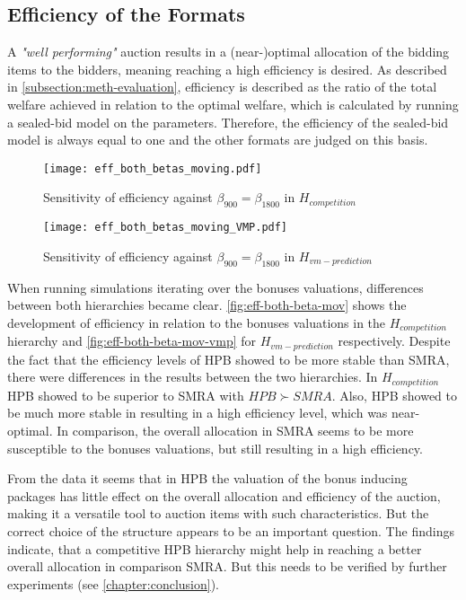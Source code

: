 \subsection{Efficiency of the Formats}\label{subsection:eff-formats}
A \textit{"well performing"} auction results in a (near-)optimal allocation of the bidding items to the bidders, meaning reaching a high efficiency is desired. As described in \autoref{subsection:meth-evaluation}, efficiency is described as the ratio of the total welfare achieved in relation to the optimal welfare, which is calculated by running a sealed-bid model on the parameters. Therefore, the efficiency of the sealed-bid model is always equal to one and the other formats are judged on this basis.

\begin{figure}[h]
	\centering
	\texttt{[image: eff\_both\_betas\_moving.pdf]}
	\caption{Sensitivity of efficiency against $ \beta_{900} = \beta_{1800} $ in $ H_{competition} $} \label{fig:eff-both-beta-mov}
	
	\vspace*{\floatsep}
	
	\texttt{[image: eff\_both\_betas\_moving\_VMP.pdf]}
	\caption{Sensitivity of efficiency against $ \beta_{900} = \beta_{1800} $ in $ H_{vm-prediction} $} \label{fig:eff-both-beta-mov-vmp}
\end{figure}

When running simulations iterating over the bonuses valuations, differences between both hierarchies became clear. \autoref{fig:eff-both-beta-mov} shows the development of efficiency in relation to the bonuses valuations in the $ H_{competition} $ hierarchy and \autoref{fig:eff-both-beta-mov-vmp} for $ H_{vm-prediction} $ respectively. Despite the fact that the efficiency levels of HPB showed to be more stable than SMRA, there were differences in the results between the two hierarchies. 
In $ H_{competition} $ HPB showed to be superior to SMRA with $ HPB \succ SMRA $. Also, HPB showed to be much more stable in resulting in a high efficiency level, which was near-optimal. In comparison, the overall allocation in SMRA seems to be more susceptible to the bonuses valuations, but still resulting in a high efficiency.

From the data it seems that in HPB the valuation of the bonus inducing packages has little effect on the overall allocation and efficiency of the auction, making it a versatile tool to auction items with such characteristics. But the correct choice of the structure appears to be an important question. The findings indicate, that a competitive HPB hierarchy might help in reaching a better overall allocation in comparison SMRA. But this needs to be verified by further experiments (see \autoref{chapter:conclusion}). 

